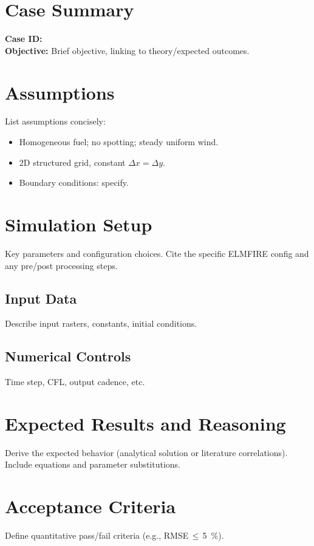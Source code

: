 \documentclass[11pt]{article}
\begin{document}
\maketitle


\section*{Case Summary}
\textbf{Case ID:} \CaseID\\
\textbf{Objective:} Brief objective, linking to theory/expected outcomes.


\section{Assumptions}
List assumptions concisely:
\begin{itemize}[nosep]
\item Homogeneous fuel; no spotting; steady uniform wind.
\item 2D structured grid, constant \(\Delta x = \Delta y\).
\item Boundary conditions: specify.
\end{itemize}


\section{Simulation Setup}
Key parameters and configuration choices. Cite the specific ELMFIRE config and any pre/post processing steps.


\subsection{Input Data}
Describe input rasters, constants, initial conditions.


\subsection{Numerical Controls}
Time step, CFL, output cadence, etc.


\section{Expected Results and Reasoning}
Derive the expected behavior (analytical solution or literature correlations). Include equations and parameter substitutions.


\section{Acceptance Criteria}
Define quantitative pass/fail criteria (e.g., RMSE\,\(\leq\)\,\SI{5}{\percent}).
\end{document}
